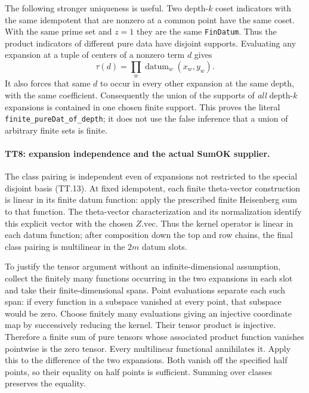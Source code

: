 The following stronger uniqueness is useful. Two depth-$k$ coset
indicators with the same idempotent that are nonzero at a common
point have the same coset. With the same prime set and $z=1$ they
are the same \texttt{FinDatum}. Thus the product indicators of
different pure data have disjoint supports. Evaluating any
expansion at a tuple of centers of a nonzero term $d$ gives
\[
       \tau(d)=\prod_w
        \operatorname{datum}_w(x_w,y_w).                   \tag{TT.14}
\]
It also forces that same $d$ to occur in every other expansion at
the same depth, with the same coefficient. Consequently the union
of the supports of \emph{all} depth-$k$ expansions is contained
in one chosen finite support. This proves the literal
\texttt{finite\_pureDat\_of\_depth}; it does not use the false
inference that a union of arbitrary finite sets is finite.

\paragraph{TT8: expansion independence and the actual SumOK supplier.}
The class pairing is independent even of expansions not restricted
to the special disjoint basis (TT.13). At fixed idempotent, each
finite theta-vector construction is linear in its finite datum
function: apply the prescribed finite Heisenberg sum to that
function. The theta-vector characterization and its normalization
identify this explicit vector with the chosen $Z.\mathrm{vec}$.
Thus the kernel operator is linear in each datum function; after
composition down the top and row chains, the final class pairing
is multilinear in the $2m$ datum slots.

To justify the tensor argument without an infinite-dimensional
assumption, collect the finitely many functions occurring in the
two expansions in each slot and take their finite-dimensional
spans. Point evaluations separate each such span: if every
function in a subspace vanished at every point, that subspace
would be zero. Choose finitely many evaluations giving an
injective coordinate map by successively reducing the kernel.
Their tensor product is injective. Therefore a finite sum of
pure tensors whose associated product function vanishes pointwise
is the zero tensor. Every multilinear functional annihilates it.
Apply this to the difference of the two expansions. Both vanish
off the specified half points, so their equality on half points
is sufficient. Summing over classes preserves the equality.

